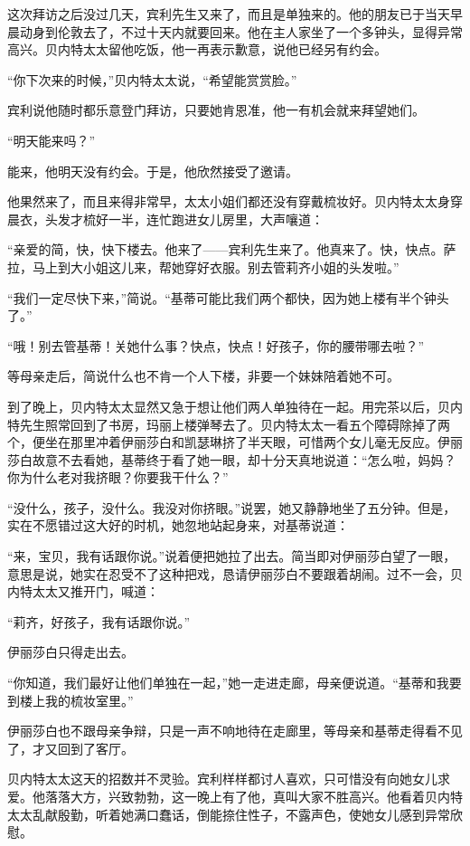 \par 这次拜访之后没过几天，宾利先生又来了，而且是单独来的。他的朋友已于当天早晨动身到伦敦去了，不过十天内就要回来。他在主人家坐了一个多钟头，显得异常高兴。贝内特太太留他吃饭，他一再表示歉意，说他已经另有约会。
\par “你下次来的时候，”贝内特太太说，“希望能赏赏脸。”
\par 宾利说他随时都乐意登门拜访，只要她肯恩准，他一有机会就来拜望她们。
\par “明天能来吗？”
\par 能来，他明天没有约会。于是，他欣然接受了邀请。
\par 他果然来了，而且来得非常早，太太小姐们都还没有穿戴梳妆好。贝内特太太身穿晨衣，头发才梳好一半，连忙跑进女儿房里，大声嚷道：
\par “亲爱的简，快，快下楼去。他来了——宾利先生来了。他真来了。快，快点。萨拉，马上到大小姐这儿来，帮她穿好衣服。别去管莉齐小姐的头发啦。”
\par “我们一定尽快下来，”简说。“基蒂可能比我们两个都快，因为她上楼有半个钟头了。”
\par “哦！别去管基蒂！关她什么事？快点，快点！好孩子，你的腰带哪去啦？”
\par 等母亲走后，简说什么也不肯一个人下楼，非要一个妹妹陪着她不可。
\par 到了晚上，贝内特太太显然又急于想让他们两人单独待在一起。用完茶以后，贝内特先生照常回到了书房，玛丽上楼弹琴去了。贝内特太太一看五个障碍除掉了两个，便坐在那里冲着伊丽莎白和凯瑟琳挤了半天眼，可惜两个女儿毫无反应。伊丽莎白故意不去看她，基蒂终于看了她一眼，却十分天真地说道：“怎么啦，妈妈？你为什么老对我挤眼？你要我干什么？”
\par “没什么，孩子，没什么。我没对你挤眼。”说罢，她又静静地坐了五分钟。但是，实在不愿错过这大好的时机，她忽地站起身来，对基蒂说道：
\par “来，宝贝，我有话跟你说。”说着便把她拉了出去。简当即对伊丽莎白望了一眼，意思是说，她实在忍受不了这种把戏，恳请伊丽莎白不要跟着胡闹。过不一会，贝内特太太又推开门，喊道：
\par “莉齐，好孩子，我有话跟你说。”
\par 伊丽莎白只得走出去。
\par “你知道，我们最好让他们单独在一起，”她一走进走廊，母亲便说道。“基蒂和我要到楼上我的梳妆室里。”
\par 伊丽莎白也不跟母亲争辩，只是一声不响地待在走廊里，等母亲和基蒂走得看不见了，才又回到了客厅。
\par 贝内特太太这天的招数并不灵验。宾利样样都讨人喜欢，只可惜没有向她女儿求爱。他落落大方，兴致勃勃，这一晚上有了他，真叫大家不胜高兴。他看着贝内特太太乱献殷勤，听着她满口蠢话，倒能捺住性子，不露声色，使她女儿感到异常欣慰。
